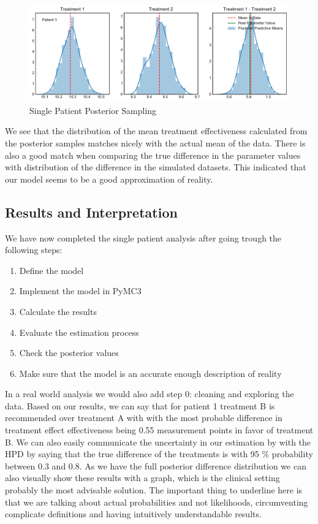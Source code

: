 \documentclass[12pt,a4paper,leqno]{report}
\theoremstyle{plain}
\theoremstyle{definition}
\theoremstyle{remark}
\begin{document}
\bigskip
\begin{figure}[H]
    \caption{Single Patient Posterior Sampling}\label{singlepatientposteriorsampling}
    \bigskip
    \includegraphics[width=\textwidth,height=\textheight,keepaspectratio]{single_patient_posterior_sampling.pdf}
\end{figure}
\bigskip

We see that the distribution of the mean treatment effectiveness calculated from the
posterior samples matches nicely with the actual mean of the data. There is also a good
match when comparing the true difference in the parameter values with distribution of
the difference in the simulated datasets. This indicated that our
model seems to be a good approximation of reality.

\subsection{Results and Interpretation}

We have now completed the single patient analysis after going trough the following steps:

\begin{enumerate}
    \item Define the model
    \item Implement the model in PyMC3
    \item Calculate the results
    \item Evaluate the estimation process
    \item Check the posterior values
    \item Make sure that the model is an accurate enough description of reality
\end{enumerate}

In a real world analysis we would also add step 0: cleaning and exploring the data.
Based on our results, we can say that for patient 1 treatment B is recommended over treatment A with
with the most probable difference in treatment effect effectiveness being 0.55
measurement points in favor of treatment B. We can also easily communicate
the uncertainty in our estimation by with the HPD by saying that the true difference of
the treatments is with 95 \% probability between 0.3 and 0.8. As we have the full
posterior difference distribution we can also visually show these results with a graph,
which is the clinical setting probably the most advisable solution. The important thing
to underline here is that we are talking about actual probabilities and not likelihoods,
circumventing complicate definitions and having intuitively understandable results.
\end{document}
